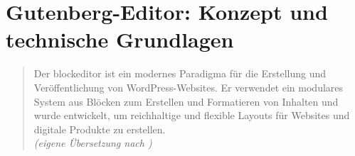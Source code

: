 



















\section{Gutenberg-Editor: Konzept und technische Grundlagen}
\begin{quote}
    Der \gls{blockeditor} ist ein modernes Paradigma für die Erstellung und Veröffentlichung von WordPress-Websites.
    Er verwendet ein modulares System aus Blöcken zum Erstellen und Formatieren von Inhalten und wurde entwickelt,
    um reichhaltige und flexible Layouts für Websites und digitale Produkte zu erstellen.
    \\[0.5em]
    \emph{(eigene Übersetzung nach \cite{wordpress2024plugin_blockeditor})}
\end{quote}



